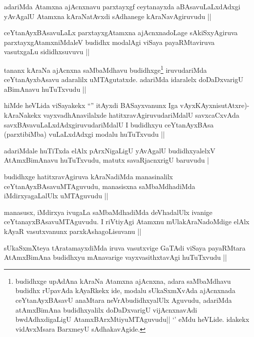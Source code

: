 \begin{artha}
adariMda Atamxna ajAcnxnavu parxtayxgf ceytanayxda aBAsavuLaLxdAdxgi yAvAgalU Atamxna kAraNatAvxdi sAdhanege kAraNavAgiruvudu ||
\end{artha}

\begin{artha}
ceYtanAyxBAsavuLaLx parxtayxgAtamxna ajAcnxnadoLage sAkiSxyAgiruva parxtayxgAtamxniMdaleV budidhx modalAgi viSaya payaRMtaviruva vasutxgaLu sididhxsuvuvu ||
\end{artha}
\begin{artha}
tananx kAraNa ajAcnxna saMbaMdhavu budidhxge\footnote{budidhxge upAdAna kAraNa Atamxna ajAcnxna, adara saMbaMdhavu budidhx rUpavAda kAyaRkekx ide, modalu sUkaSxmXvAda ajAcnxnada ceYtanAyxBAsavU anaMtara neVrAbudidhxyalUlx Aguvudu, adariMda atAmxBimAna budidhxyalilx doDaDxvarigU vijAcnxnavAdi bwdAdhxdigaLigU AtamxBArxMtiyuMTAguvudu|| `\stext' eMdu heVLide. idakekx vidAvxMsara BarxmeyU sAdhakavAgide.} iruvudariMda ceYtanAyxbAsavu adaralilx uMTAgutatxde. adariMda idaralelx doDaDxvarigU aBimAnavu huTuTxvudu ||
\end{artha}

\begin{artha}
hiMde heVLida viSayakekx ``\stext'' itAyxdi BASayxvanunx Iga vAyxKAyxnisutAtxre)- kAraNakekx vayxvadhAnavilalxde hatitxravAgiruvudariMdalU savxcaCxvAda savxBAvavuLaLxdAdxgiruvudariMdalU I budidhxyu ceYtanAyxBAsa (parxtibiMba) vuLaLxdAdxgi modalu huTuTxvudu ||
\end{artha}

\begin{artha}
adariMdale huTiTxda elAlx pArxNigaLigU yAvAgalU budidhxyalelxV AtAmxBimAnavu huTuTxvudu, matutx savaRjacnxrigU baruvudu |
\end{artha}

\begin{artha}
budidhxge hatitxravAgiruva kAraNadiMda manasinalilx ceYtanAyxBAsavuMTAguvudu, manasisxna saMbaMdhadiMda iMdirxyagaLalUlx uMTAguvudu ||
\end{artha}

\begin{artha}
manasusx, iMdirxya ivugaLa saMbaMdhadiMda deVhadalUlx ivanige ceYtanayxBAsavuMTAguvudu. I riVtiyAgi Atamxnu mUlakAraNadoMdige elAlx kAyaR vasutxvanunx parxkAshagoLisuvanu ||
\end{artha}

\begin{artha}
sUkaSxmXteya tAratamayxdiMda iruva vasutxvige GaTAdi viSaya payaRMtara AtAmxBimAna budidhxyu mAnavarige vayxvasithxtavAgi huTuTxvudu ||
\end{artha}

